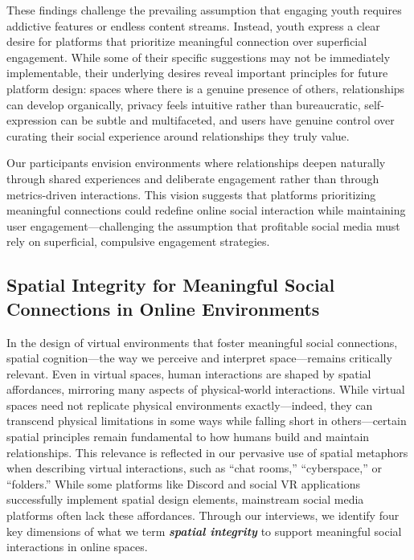 These findings challenge the prevailing assumption that engaging youth requires addictive features or endless content streams. Instead, youth express a clear desire for platforms that prioritize meaningful connection over superficial engagement. While some of their specific suggestions may not be immediately implementable, their underlying desires reveal important principles for future platform design: spaces where there is a genuine presence of others, relationships can develop organically, privacy feels intuitive rather than bureaucratic, self-expression can be subtle and multifaceted, and users have genuine control over curating their social experience around relationships they truly value. 

Our participants envision environments where relationships deepen naturally through shared experiences and deliberate engagement rather than through metrics-driven interactions. This vision suggests that platforms prioritizing meaningful connections could redefine online social interaction while maintaining user engagement---challenging the assumption that profitable social media must rely on superficial, compulsive engagement strategies.

\subsection{Spatial Integrity for Meaningful Social Connections in Online Environments}
In the design of virtual environments that foster meaningful social connections, spatial cognition---the way we perceive and interpret space---remains critically relevant. Even in virtual spaces, human interactions are shaped by spatial affordances, mirroring many aspects of physical-world interactions. While virtual spaces need not replicate physical environments exactly---indeed, they can transcend physical limitations in some ways while falling short in others---certain spatial principles remain fundamental to how humans build and maintain relationships. This relevance is reflected in our pervasive use of spatial metaphors when describing virtual interactions, such as ``chat rooms,'' ``cyberspace,'' or ``folders.'' While some platforms like Discord and social VR applications successfully implement spatial design elements, mainstream social media platforms often lack these affordances. Through our interviews, we identify four key dimensions of what we term \textbf{\textit{spatial integrity}} to support meaningful social interactions in online spaces.

